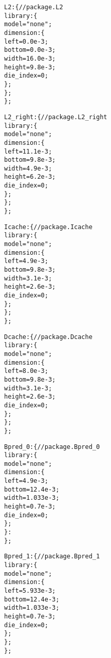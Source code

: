 {\begin{alltt}
            L2: \{ // package.L2
                library: \{
                    model = "none";
                    dimension: \{
                        left = 0.0e-3;
                        bottom = 0.0e-3;
                        width = 16.0e-3;
                        height = 9.8e-3;
                        die_index = 0;
                    \};
                \};
            \};
            
            L2\_right: \{ // package.L2\_right
                library: \{
                    model = "none";
                    dimension: \{
                        left = 11.1e-3;
                        bottom = 9.8e-3;
                        width = 4.9e-3;
                        height = 6.2e-3;
                        die_index = 0;
                    \};
                \};
            \};

            Icache: \{ // package.Icache
                library: \{
                    model = "none";
                    dimension: \{
                        left = 4.9e-3;
                        bottom = 9.8e-3;
                        width = 3.1e-3;
                        height = 2.6e-3;
                        die_index = 0;
                    \};
                \};
            \};
            
            Dcache: \{ // package.Dcache
                library: \{
                    model = "none";
                    dimension: \{
                        left = 8.0e-3;
                        bottom = 9.8e-3;
                        width = 3.1e-3;
                        height = 2.6e-3;
                        die_index = 0;
                    \};
                \};
            \};

            Bpred\_0: \{ // package.Bpred\_0
                library: \{
                    model = "none";
                    dimension: \{
                        left = 4.9e-3;
                        bottom = 12.4e-3;
                        width = 1.033e-3;
                        height = 0.7e-3;
                        die_index = 0;
                    \};
                \}:
            \};

            Bpred\_1: \{ // package.Bpred\_1
                library: \{
                    model = "none";
                    dimension: \{
                        left = 5.933e-3;
                        bottom = 12.4e-3;
                        width = 1.033e-3;
                        height = 0.7e-3;
                        die_index = 0;
                    \};
                \};
            \};
            

\end{alltt}}
